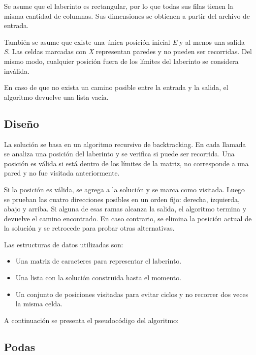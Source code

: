 Se asume que el laberinto es rectangular, por lo que todas sus filas tienen la misma cantidad de columnas. Sus dimensiones se obtienen a partir del archivo de entrada.

También se asume que existe una única posición inicial \textit{E} y al menos una salida \textit{S}. Las celdas marcadas con \textit{X} representan paredes y no pueden ser recorridas. Del mismo modo, cualquier posición fuera de los límites del laberinto se considera inválida.

En caso de que no exista un camino posible entre la entrada y la salida, el algoritmo devuelve una lista vacía.

\subsection{Diseño}

La solución se basa en un algoritmo recursivo de backtracking. En cada llamada se analiza una posición del laberinto y se verifica si puede ser recorrida. Una posición es válida si está dentro de los límites de la matriz, no corresponde a una pared y no fue visitada anteriormente.

Si la posición es válida, se agrega a la solución y se marca como visitada. Luego se prueban las cuatro direcciones posibles en un orden fijo: derecha, izquierda, abajo y arriba. Si alguna de esas ramas alcanza la salida, el algoritmo termina y devuelve el camino encontrado. En caso contrario, se elimina la posición actual de la solución y se retrocede para probar otras alternativas.

Las estructuras de datos utilizadas son:

\begin{itemize}
    \item Una matriz de caracteres para representar el laberinto.
    \item Una lista con la solución construida hasta el momento.
    \item Un conjunto de posiciones visitadas para evitar ciclos y no recorrer dos veces la misma celda.
\end{itemize}

A continuación se presenta el pseudocódigo del algoritmo:



\subsection{Podas}

